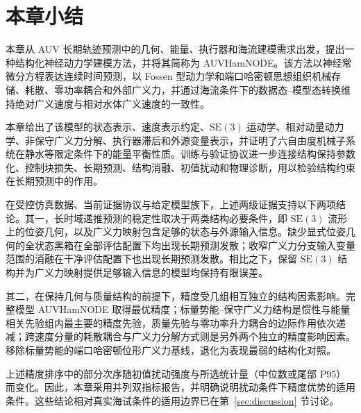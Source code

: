 \documentclass[UTF8,zihao=-4]{ctexrep}
\newcommand{\SE}{\mathrm{SE}}
\begin{document}
\section{本章小结}
\label{sec:chapter-summary}

本章从 AUV 长期轨迹预测中的几何、能量、执行器和海流建模需求出发，提出一种结构化神经动力学建模方法，并将其简称为 AUVHamNODE。该方法以神经常微分方程表达连续时间预测，以 Fossen 型动力学和端口哈密顿思想组织机械存储、耗散、零功率耦合和外部广义力，并通过海流条件下的数据态--模型态转换维持绝对广义速度与相对水体广义速度的一致性。

本章给出了该模型的状态表示、速度表示约定、\(\SE(3)\) 运动学、相对动量动力学、非保守广义力分解、执行器滞后和外源变量表示，并证明了六自由度机械子系统在静水等限定条件下的能量平衡性质。训练与验证协议进一步连接结构保持参数化、控制块损失、长期预测、结构消融、初值扰动和物理诊断，用以检验结构约束在长期预测中的作用。

在受控仿真数据、当前证据协议与给定模型族下，上述两级证据支持以下两项结论。其一，长时域递推预测的稳定性取决于两类结构必要条件，即 \(\SE(3)\) 流形上的位姿几何，以及广义力映射包含足够的状态与外源输入信息。缺少显式位姿几何的全状态黑箱在全部评估配置下均出现长期预测发散；收窄广义力分支输入变量范围的消融在干净评估配置下也出现长期预测发散。相比之下，保留 \(\SE(3)\) 结构并为广义力映射提供足够输入信息的模型均保持有限误差。

其二，在保持几何与质量结构的前提下，精度受几组相互独立的结构因素影响。完整模型 AUVHamNODE 取得最优精度；标量势能--保守广义力结构是惯性与能量相关先验组内最主要的精度先验，质量先验与零功率升力耦合的边际作用依次递减；跨速度分量的耗散耦合与广义力分解方式则是另外两个独立的精度影响因素。移除标量势能的端口哈密顿位形广义力基线，退化为表现最弱的结构化对照。

上述精度排序中的部分次序随初值扰动强度与所选统计量（中位数或尾部 P95）而变化。因此，本章采用并列双指标报告，并明确说明扰动条件下精度优势的适用条件。这些结论相对真实海试条件的适用边界已在第~\ref{sec:discussion} 节讨论。



\end{document}
